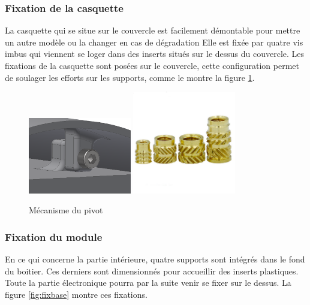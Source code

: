 \subsubsection{Fixation de la casquette}

La casquette qui se situe sur le couvercle est facilement démontable pour mettre un autre modèle ou 
la changer en cas de dégradation Elle est fixée par quatre vis imbus qui viennent se loger dans des inserts 
situés sur le dessus du couvercle. Les fixations de la casquette sont posées sur le couvercle, cette 
configuration permet de soulager les efforts sur les supports, comme le montre la figure \ref{fig:casquette}.

\begin{figure}[H]
    \centering
    \includegraphics[width=0.4\textwidth]{Images/photos_PGA/fixcasquette.PNG}
    \includegraphics[width=0.4\textwidth]{Images/photos_PGA/inserts.jpg}
    \caption{Mécanisme du pivot}
    \label{fig:casquette}
\end{figure}

\subsubsection{Fixation du module}

En ce qui concerne la partie intérieure, quatre supports sont intégrés dans le fond du boitier. Ces derniers 
sont dimensionnés pour accueillir des inserts plastiques. Toute la partie électronique pourra par la 
suite venir se fixer sur le dessus. La figure \ref{fig:fixbase} montre ces fixations.

